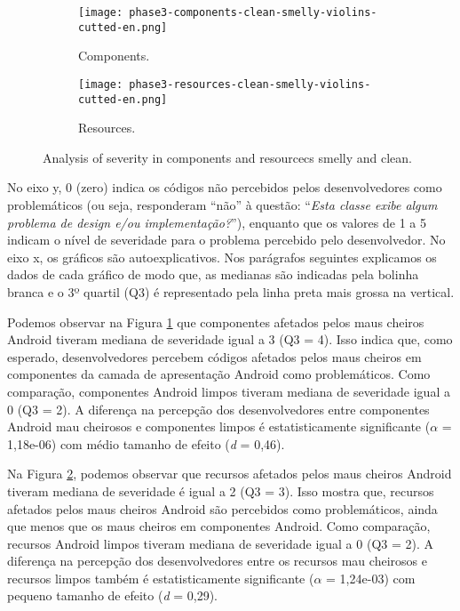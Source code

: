 \begin{figure*}[!htb]
\centering
{}\textwidth
\captionsetup[subfigure]{width=.9\imagewidth,justification=raggedright}%
\begin{subfigure}[t]{.49\textwidth}
  \centering
  \hspace*{-1cm}%
  \texttt{[image: phase3-components-clean-smelly-violins-cutted-en.png]}
  \caption{Components.}
  \label{fig:components-violins}
\end{subfigure}
\begin{subfigure}[t]{.49\textwidth}
  \centering
  \texttt{[image: phase3-resources-clean-smelly-violins-cutted-en.png]}
  \caption{Resources.}
  \label{fig:resources-violins}
\end{subfigure}%
\caption{Analysis of severity in components and resourcecs smelly and clean.}
\label{fig:smelly-clean-consolidado}
\end{figure*}

No eixo y, 0 (zero) indica os códigos não percebidos pelos desenvolvedores como problemáticos (ou seja, responderam ``não'' à questão: ``\emph{Esta classe exibe algum problema de design e/ou implementação?}''), enquanto que os valores de 1 a 5 indicam o nível de severidade para o problema percebido pelo desenvolvedor. No eixo x, os gráficos são autoexplicativos. Nos parágrafos seguintes explicamos os dados de cada gráfico de modo que, as medianas são indicadas pela bolinha branca e o 3º quartil (Q3) é representado pela linha preta mais grossa na vertical.

Podemos observar na Figura \ref{fig:components-violins} que componentes afetados pelos maus cheiros Android tiveram mediana de severidade igual a 3 (Q3 = 4). Isso indica que, como esperado, desenvolvedores percebem códigos afetados pelos maus cheiros em componentes da camada de apresentação Android como problemáticos. Como comparação, componentes Android limpos tiveram mediana de severidade igual a 0 (Q3 = 2). A diferença na percepção dos desenvolvedores entre componentes Android mau cheirosos e componentes limpos é estatisticamente significante ($\alpha$ = 1,18e-06) com médio tamanho de efeito (\textit{d} = 0,46).

Na Figura \ref{fig:resources-violins}, podemos observar que recursos afetados pelos maus cheiros Android tiveram mediana de severidade é igual a 2 (Q3 = 3). Isso mostra que, recursos afetados pelos maus cheiros Android são percebidos como problemáticos, ainda que menos que os maus cheiros em componentes Android. Como comparação, recursos Android limpos tiveram mediana de severidade igual a 0 (Q3 = 2). A diferença na percepção dos desenvolvedores entre os recursos mau cheirosos e recursos limpos também é estatisticamente significante ($\alpha$ = 1,24e-03) com pequeno tamanho de efeito (\textit{d} = 0,29).

